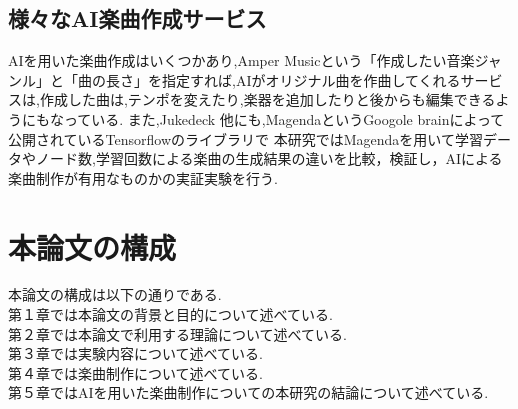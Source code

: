 \subsection{様々なAI楽曲作成サービス}
AIを用いた楽曲作成はいくつかあり,Amper Musicという「作成したい音楽ジャンル」と「曲の長さ」を指定すれば,AIがオリジナル曲を作曲してくれるサービスは,作成した曲は,テンポを変えたり,楽器を追加したりと後からも編集できるようにもなっている.
また,Jukedeck
他にも,MagendaというGoogole brainによって公開されているTensorflowのライブラリで
本研究ではMagendaを用いて学習データやノード数,学習回数による楽曲の生成結果の違いを比較，検証し，AIによる楽曲制作が有用なものかの実証実験を行う.
\section{本論文の構成}
本論文の構成は以下の通りである.\\
第１章では本論文の背景と目的について述べている.\\
第２章では本論文で利用する理論について述べている.\\
第３章では実験内容について述べている.\\
第４章では楽曲制作について述べている.\\
第５章ではAIを用いた楽曲制作についての本研究の結論について述べている.\\